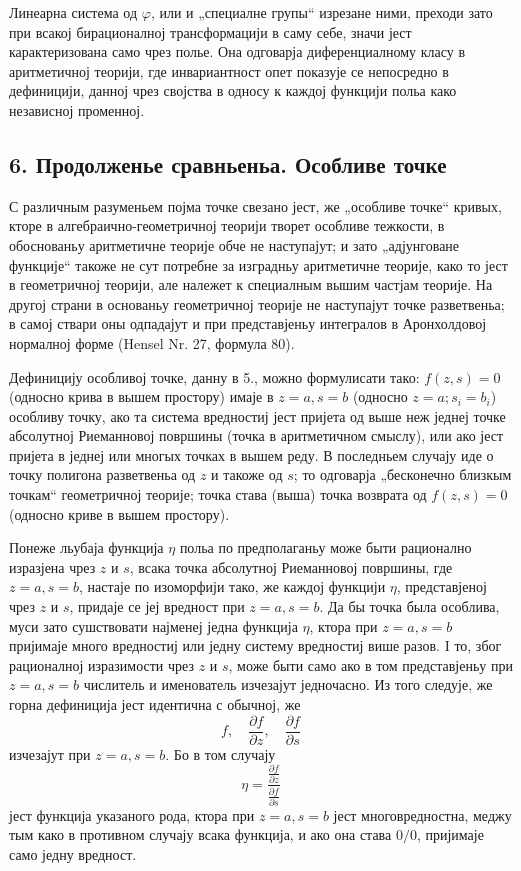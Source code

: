 ﻿\documentclass[11pt]{article}
\providecommand{\p}{\partial}
\begin{document}
Линеарна система од \(\varphi\), или и „специалне групы“ изрезане ними, преходи зато при всакој бирационалној трансформацији в саму себе, значи јест карактеризована само чрез полье. Она одговарја диференциалному класу в аритметичној теорији, где инвариантност опет показује се непосредно в дефиницији, данној чрез својства в односу к каждој функцији польа како независној променној.

\subsection*{6. Продолженье сравньеньа. Особливе точке}
С различным разуменьем појма точке свезано јест, же „особливе точке“ кривых, кторе в алгебраично-геометричној теорији творет особливе тежкости, в обоснованьу аритметичне теорије обче не наступајут; и зато „адјунговане функције“ такоже не сут потребне за изградньу аритметичне теорије, како то јест в геометричној теорији, але належет к специалным вышим частјам теорије. На другој страни в основаньу геометричној теорије не наступајут точке разветвеньа; в самој ствари оны одпадајут и при представјеньу интегралов в Аронхолдовој нормалној форме (Hensel Nr. 27, формула 80).

Дефиницију особливој точке, данну в 5., можно формулисати тако: \(f(z,s)=0\) (односно крива в вышем простору) имаје в \(z=a,s=b\) (односно \(z=a; s_i=b_i\)) особливу точку, ако та система вредностиј јест пријета од выше неж једнеј точке абсолутној Риеманновој површины (точка в аритметичном смыслу), или ако јест пријета в једнеј или многых точках в вышем реду. В последньем случају иде о точку полигона разветвеньа од \(z\) и такоже од \(s\); то одговарја „бесконечно близкым точкам“ геометричној теорије; точка става (выша) точка возврата од \(f(z,s)=0\) (односно криве в вышем простору).

Понеже льубаја функција \(\eta\) польа по предполаганьу може быти рационално изразјена чрез \(z\) и \(s\), всака точка абсолутној Риеманновој површины, где \(z=a,s=b\), настаје по изоморфији тако, же каждој функцији \(\eta\), представјеној чрез \(z\) и \(s\), придаје се јеј вредност при \(z=a,s=b\). Да бы точка была особлива, муси зато сушствовати најменеј једна функција \(\eta\), ктора при \(z=a,s=b\) пријимаје много вредностиј или једну систему вредностиј више разов. I то, због рационалној изразимости чрез \(z\) и \(s\), може быти само ако в том представјеньу при \(z=a,s=b\) числитель и именователь изчезајут једночасно. Из того следује, же горна дефиниција јест идентична с обычној, же
\[
f,\quad \frac{\p f}{\p z},\quad \frac{\p f}{\p s}
\]
изчезајут при \(z=a,s=b\). Бо в том случају
\[
\eta=\frac{\frac{\p f}{\p z}}{\frac{\p f}{\p s}}
\]
јест функција указаного рода, ктора при \(z=a,s=b\) јест многовредностна, меджу тым како в противном случају всака функција, и ако она става \(0/0\), пријимаје само једну вредност.
\end{document}
